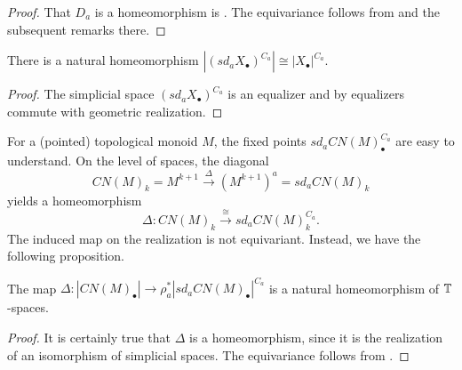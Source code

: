 \begin{proof}
That $D_a$ is a homeomorphism is \cite[Lemma~1.1, \pno~468]{bhmcyclotomic}.
The equivariance follows from \cite[Lemma~1.11, \pno~470]{bhmcyclotomic} and 
the subsequent remarks there.
\end{proof}

\begin{cor}
There is a natural homeomorphism $|(sd_aX_\bullet)^{C_a}|\cong |X_\bullet|^{C_a}$.
\end{cor}

\begin{proof}
The simplicial space $(sd_aX_\bullet)^{C_a}$ is an equalizer
and by \cite[Corollary~11.6, \pno~105]{mayloopspaces} equalizers
commute with geometric realization.
\end{proof}

For a (pointed) topological monoid $M$, the fixed points $sd_aCN(M)_\bullet^{C_a}$ are 
easy to understand. On the level of spaces, the diagonal
\[
CN(M)_k = M^{k+1}\xrightarrow{\Delta} (M^{k+1})^a = sd_aCN(M)_k
\]
yields a homeomorphism
\[
\Delta: CN(M)_k\xrightarrow{\cong} sd_aCN(M)_k^{C_a}.
\]
The induced map on the realization is not equivariant. 
Instead, we have the following proposition.

\begin{prop}
The map $\Delta:|CN(M)_\bullet|\to \rho_{a}^\ast |sd_aCN(M)_\bullet|^{C_a}$
is a natural homeomorphism of $\mathbb{T}$-spaces.
\end{prop}

\begin{proof}
It is certainly true that $\Delta$ is a homeomorphism, 
since it is the realization of an isomorphism of simplicial spaces.
The equivariance follows from \cite[Lemma~1.10, \pno~470]{bhmcyclotomic}.
\end{proof}



